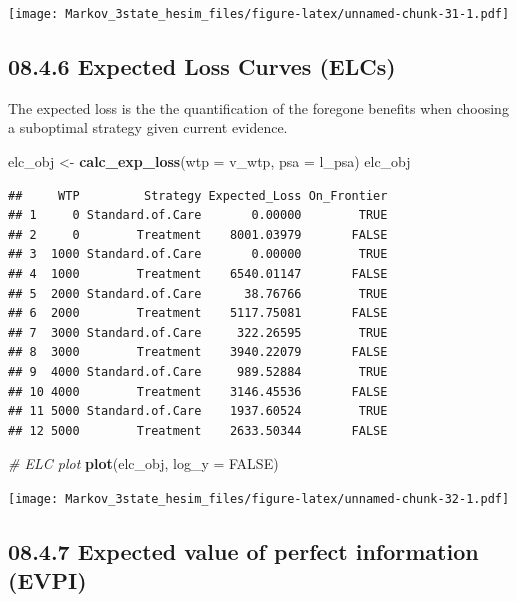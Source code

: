 \documentclass[
]{article}
\newenvironment{Shaded}{\begin{snugshade}}{\end{snugshade}}
\newcommand{\CommentTok}[1]{\textcolor[rgb]{0.56,0.35,0.01}{\textit{#1}}}
\newcommand{\DataTypeTok}[1]{\textcolor[rgb]{0.13,0.29,0.53}{#1}}
\newcommand{\KeywordTok}[1]{\textcolor[rgb]{0.13,0.29,0.53}{\textbf{#1}}}
\newcommand{\NormalTok}[1]{#1}
\newcommand{\OtherTok}[1]{\textcolor[rgb]{0.56,0.35,0.01}{#1}}
\newcommand{\StringTok}[1]{\textcolor[rgb]{0.31,0.60,0.02}{#1}}
\begin{document}
\texttt{[image: Markov\_3state\_hesim\_files/figure-latex/unnamed-chunk-31-1.pdf]}

\hypertarget{expected-loss-curves-elcs}{%
\subsection{08.4.6 Expected Loss Curves
(ELCs)}\label{expected-loss-curves-elcs}}

The expected loss is the the quantification of the foregone benefits
when choosing a suboptimal strategy given current evidence.

\begin{Shaded}
\begin{Highlighting}[]
\NormalTok{elc_obj <-}\StringTok{ }\KeywordTok{calc_exp_loss}\NormalTok{(}\DataTypeTok{wtp =}\NormalTok{ v_wtp, }\DataTypeTok{psa =}\NormalTok{ l_psa)}
\NormalTok{elc_obj}
\end{Highlighting}
\end{Shaded}

\begin{verbatim}
##     WTP         Strategy Expected_Loss On_Frontier
## 1     0 Standard.of.Care       0.00000        TRUE
## 2     0        Treatment    8001.03979       FALSE
## 3  1000 Standard.of.Care       0.00000        TRUE
## 4  1000        Treatment    6540.01147       FALSE
## 5  2000 Standard.of.Care      38.76766        TRUE
## 6  2000        Treatment    5117.75081       FALSE
## 7  3000 Standard.of.Care     322.26595        TRUE
## 8  3000        Treatment    3940.22079       FALSE
## 9  4000 Standard.of.Care     989.52884        TRUE
## 10 4000        Treatment    3146.45536       FALSE
## 11 5000 Standard.of.Care    1937.60524        TRUE
## 12 5000        Treatment    2633.50344       FALSE
\end{verbatim}

\begin{Shaded}
\begin{Highlighting}[]
\CommentTok{# ELC plot}
\KeywordTok{plot}\NormalTok{(elc_obj, }\DataTypeTok{log_y =} \OtherTok{FALSE}\NormalTok{)}
\end{Highlighting}
\end{Shaded}

\texttt{[image: Markov\_3state\_hesim\_files/figure-latex/unnamed-chunk-32-1.pdf]}

\hypertarget{expected-value-of-perfect-information-evpi}{%
\subsection{08.4.7 Expected value of perfect information
(EVPI)}\label{expected-value-of-perfect-information-evpi}}
\end{document}
